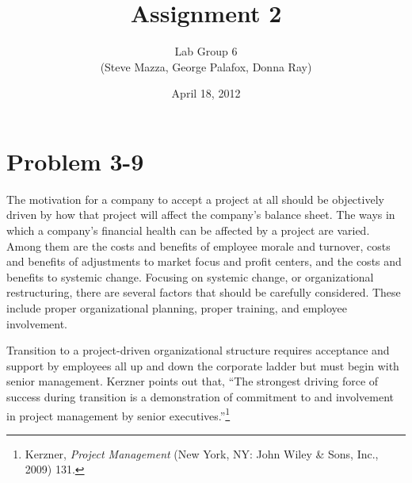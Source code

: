 \documentclass[letterpaper,10pt]{article}
\title{Assignment 2}
\author{Lab Group 6 \\ { \small (Steve Mazza, George Palafox, Donna Ray)}}
\date{April 18, 2012}
\begin{document}
\maketitle


\section*{Problem 3-9}
The motivation for a company to accept a project at all should be objectively driven by how that project will affect the company's balance sheet.  The ways in which a company's financial health can be affected by a project are varied.  Among them are the costs and benefits of employee morale and turnover, costs and benefits of adjustments to market focus and profit centers, and the costs and benefits to systemic change.  Focusing on systemic change, or organizational restructuring, there are several factors that should be carefully considered.  These include proper organizational planning, proper training, and employee involvement.

Transition to a project-driven organizational structure requires acceptance and support by employees all up and down the corporate ladder but must begin with senior management.  Kerzner points out that, ``The strongest driving force of success during transition is a demonstration of commitment to and involvement in project management by senior executives.''\footnote{Kerzner, \emph{Project Management} (New York, NY: John Wiley \& Sons, Inc., 2009) 131.}
\end{document}
